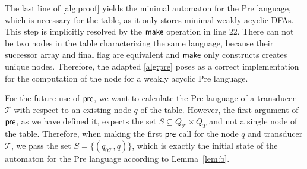 \par 

The last line of \autoref{alg:proof} yields the minimal automaton for the Pre language, which is necessary for the table, as it only stores minimal weakly acyclic DFAs. This step is implicitly resolved by the $\operatorname{\textsf{make}}$ operation in line 22. There can not be two nodes in the table characterizing the same language, because their successor array and final flag are equivalent and $\operatorname{\textsf{make}}$ only constructs creates unique nodes.
Therefore, the adapted \autoref{alg:pre} poses as a correct implementation for the computation of the node for a weakly acyclic Pre language.

\par 

For the future use of $\operatorname{\textsf{pre}}$, we want to calculate the Pre language of a transducer $\mathcal{T}$ with respect to an existing node $q$ of the table. However, the first argument of $\operatorname{\textsf{pre}}$, as we have defined it, expects the set $S \subseteq Q_{\mathcal{T}} \times Q_{T}$ and not a single node of the table. Therefore, when making the first $\operatorname{\textsf{pre}}$ call for the node $q$ and transducer $\mathcal{T}$, we pass the set $S = \{ (q_{0\mathcal{T}},q) \}$, which is exactly the initial state of the automaton for the Pre language according to Lemma~\autoref{lem:b}.